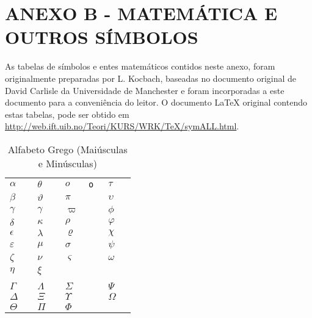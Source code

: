 \renewcommand{\thechapter}{}
\chapter{ANEXO B - MATEMÁTICA E OUTROS SÍMBOLOS}
\label{anexoB}
\renewcommand{\thechapter}{B}

As tabelas de símbolos e entes matemáticos contidos neste anexo, foram originalmente preparadas por L. Kocbach, baseadas no documento original de David Carlisle da Universidade de Manchester e foram incorporadas a este documento para a conveniência do leitor. O documento \LaTeX{} original contendo estas tabelas, pode ser obtido em \url{http://web.ift.uib.no/Teori/KURS/WRK/TeX/symALL.html}.

\def\W#1#2{$#1{#2}$ &\tt\string#1\string{#2\string}}
\def\X#1{$#1$ &\tt\string#1}
\def\Y#1{$\big#1$ &\tt\string#1}
\def\Z#1{\tt\string#1}



\begin{table}[H]
	\centering
	\caption{Alfabeto Grego (Maiúsculas e Minúsculas)}
	\label{tab:alfa_grego}
	\begin{tabular}{p{0.5cm} p{2.25cm} p{0.5cm} p{2.25cm} p{0.5cm} p{2.25cm} p{0.5cm} p{2.25cm}}
		\toprule
		\X\alpha        &\X\theta       &\X o           &\X\tau         \\[0.5em]
		\X\beta         &\X\vartheta    &\X\pi          &\X\upsilon     \\[0.5em]
		\X\gamma        &\X\gamma       &\X\varpi       &\X\phi         \\[0.5em]
		\X\delta        &\X\kappa       &\X\rho         &\X\varphi      \\[0.5em]
		\X\epsilon      &\X\lambda      &\X\varrho      &\X\chi         \\[0.5em]
		\X\varepsilon   &\X\mu          &\X\sigma       &\X\psi         \\[0.5em]
		\X\zeta         &\X\nu          &\X\varsigma    &\X\omega       \\[0.5em]
		\X\eta          &\X\xi                                          \\[0.5em]
		\\[0.5em]
		\X\Gamma        &\X\Lambda      &\X\Sigma       &\X\Psi         \\[0.5em]
		\X\Delta        &\X\Xi          &\X\Upsilon     &\X\Omega       \\[0.5em]
		\X\Theta        &\X\Pi          &\X\Phi \\
		\bottomrule
	\end{tabular}
\end{table}

